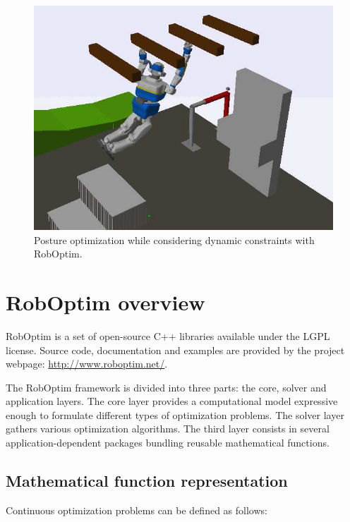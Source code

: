 \documentclass[conference,final,a4paper,twocolumn,9pt]{IEEEtran}
\begin{document}
\begin{figure}[ht!]
  \begin{center}
    \includegraphics[width=\linewidth]{agent-067.jpg}
    \caption{Posture optimization while considering dynamic
      constraints with RobOptim.\label{fig:stence-optimization}}
  \end{center}
\end{figure}



\section{RobOptim overview}\label{sec:roboptim}


RobOptim is a set of open-source C++ libraries available under the
LGPL license. Source code, documentation and examples are provided by
the project webpage: \mbox{\url{http://www.roboptim.net/}}.


The RobOptim framework is divided into three parts: the core, solver
and application layers. The core layer provides a computational model
expressive enough to formulate different types of optimization
problems. The solver layer gathers various optimization
algorithms. The third layer consists in several application-dependent
packages bundling reusable mathematical functions.


\subsection{Mathematical function representation}


Continuous optimization problems can be defined as follows:
\end{document}
